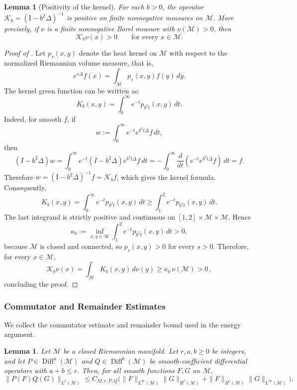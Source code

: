 \documentclass[11pt]{article}
\newtheorem{lemma}[theorem]{Lemma}
\theoremstyle{definition}
\def\K{\mathcal K}
\def\Kb{\mathcal K_b}
\def\M{\mathcal M}
\def\I{\mathrm{I}}
\begin{document}
\begin{lemma}[Positivity of the kernel]\label{lem:Kb_positive}
For each $b>0$, the operator $\Kb=(\I-b^2\Delta)^{-1}$ is positive on
finite nonnegative measures on  $\M$. More precisely, if $\nu$ is a
finite nonnegative Borel measure with $\nu( \M)>0$, then 
\[
\Kb\nu(x)>0
\qquad\text{for every }x\in \M.
\]
\end{lemma}

\begin{proof}[Proof of ]
Let \(p_s(x,y)\) denote the heat kernel on  \(\M\) with respect to
the normalized  Riemannian volume measure, that is,
\[
e^{s\Delta}f(x)=\int_{ \M}p_s(x,y)f(y)\,dy .
\]
The kernel green function can be written as:
\begin{equation}\label{eq:Kb_heat_kernel_representation}
K_b(x,y)=\int_0^\infty e^{-t}p_{b^2t}(x,y)\,dt.
\end{equation}
Indeed, for smooth \(f\), if
\[
w:=\int_0^\infty e^{-t}e^{b^2t\Delta}f\,dt,
\]
then
\[
(I-b^2\Delta)w
=
\int_0^\infty e^{-t}(I-b^2\Delta)e^{b^2t\Delta}f\,dt
=
-\int_0^\infty \frac{d}{dt}\left(e^{-t}e^{b^2t\Delta}f\right)\,dt
=f.
\]
Therefore \(w=(\I-b^2\Delta)^{-1}f=\K_bf\), which gives the kernel formula.
Consequently,
\[
K_b(x,y)=\int_0^\infty e^{-t}p_{b^2t}(x,y)\,dt
\ge
\int_1^2 e^{-t}p_{b^2t}(x,y)\,dt .
\]
The last integrand is  strictly positive and continuous on
\([1,2]\times \M\times \M\). Hence
\begin{equation}\label{eq:Kb_positive_lower_bound}
\kappa_b:=\inf_{x,y\in\M}\int_1^2 e^{-t}p_{b^2t}(x,y)\,dt>0,
\end{equation}
 because \(\M\) is closed and connected, so \(p_s(x,y)>0\) for every \(s>0\).
Therefore, for every $x\in \M$,
\[
\Kb\nu(x)
=
\int_{ \M}K_b(x,y)\,d\nu(y)
\ge
\kappa_b\,\nu( \M)
>
0\,,
\]
concluding the proof.
\end{proof}



\subsubsection{Commutator and Remainder Estimates}
\label{app:commutator_remainder_estimates}

We collect the commutator estimate and remainder bound used in the energy
argument.

\begin{lemma}\label{lem:mixed_moser}
Let $\mathcal{M}$ be a closed Riemannian manifold.  Let \(r,a,b\ge0\) be integers, and let
\(P\in\operatorname{Diff}^a(\mathcal{M})\) and \(Q\in\operatorname{Diff}^b(\mathcal{M})\) be 
smooth-coefficient differential operators with \(a+b\le r\).  Then, for all
smooth functions $F,G$ on $\mathcal{M}$,
\[
\|P(F) Q(G)\|_{L^2(\mathcal{M})}
\le
C_{M,r,P,Q}
\bigl(
\|F\|_{L^\infty(\M)}\|G\|_{H^r(\mathcal{M})}
+
\|F\|_{H^r(\M)}\|G\|_{L^\infty(\mathcal{M})}
\bigr).
\]
\end{lemma}
\end{document}
